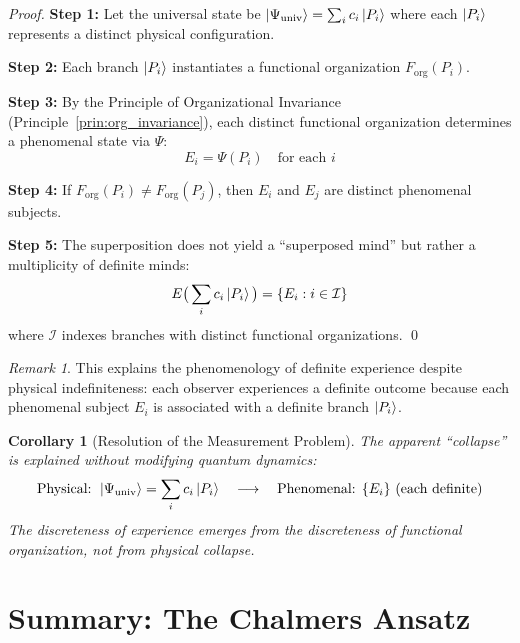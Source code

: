 \documentclass[11pt,a4paper]{article}
\theoremstyle{definition}
\theoremstyle{plain}
\newtheorem{corollary}{Corollary}[section]
\theoremstyle{remark}
\newtheorem{remark}{Remark}[section]
\newcommand{\Forg}{F_{\text{org}}}
\newcommand{\Psiuniv}{\Psi_{\text{univ}}}
\begin{document}
\begin{proof}
\textbf{Step 1:} Let the universal state be $\ket{\Psiuniv} = \sum_i c_i \ket{P_i}$ where each $\ket{P_i}$ represents a distinct physical configuration.

\textbf{Step 2:} Each branch $\ket{P_i}$ instantiates a functional organization $\Forg(P_i)$.

\textbf{Step 3:} By the Principle of Organizational Invariance (Principle~\ref{prin:org_invariance}), each distinct functional organization determines a phenomenal state via $\Psi$:
\begin{equation}
E_i = \Psi(P_i) \quad \text{for each } i
\end{equation}

\textbf{Step 4:} If $\Forg(P_i) \neq \Forg(P_j)$, then $E_i$ and $E_j$ are distinct phenomenal subjects.

\textbf{Step 5:} The superposition does not yield a ``superposed mind'' but rather a multiplicity of definite minds:
\begin{equation}
E\big( \sum_i c_i \ket{P_i} \big) = \{ E_i : i \in \mathcal{I} \}
\end{equation}
where $\mathcal{I}$ indexes branches with distinct functional organizations. \qed
\end{proof}

\begin{remark}
This explains the phenomenology of definite experience despite physical indefiniteness: each observer experiences a definite outcome because each phenomenal subject $E_i$ is associated with a definite branch $\ket{P_i}$.
\end{remark}

\begin{corollary}[Resolution of the Measurement Problem]
The apparent ``collapse'' is explained without modifying quantum dynamics:
\begin{equation}
\text{Physical: } \ket{\Psiuniv} = \sum_i c_i \ket{P_i} \quad \longrightarrow \quad \text{Phenomenal: } \{ E_i \} \text{ (each definite)}
\end{equation}
The discreteness of experience emerges from the discreteness of functional organization, not from physical collapse.
\end{corollary}

\section{Summary: The Chalmers Ansatz}
\end{document}
